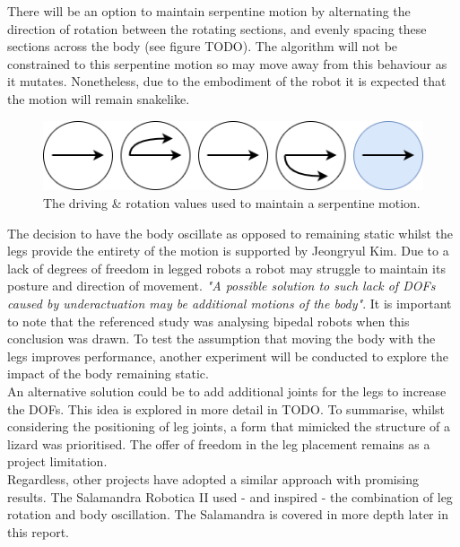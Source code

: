 \documentclass{article}
\begin{document}
There will be an option to maintain serpentine motion by alternating the direction of rotation between the rotating sections, and evenly spacing these sections across the body (see figure TODO). The algorithm will not be constrained to this serpentine motion so may move away from this behaviour as it mutates. Nonetheless, due to the embodiment of the robot it is expected that the motion will remain snakelike.\\
\begin{figure}[H]
\centering
\includegraphics[scale=0.6]{serpentineDiagram}
\caption{The driving \& rotation values used to maintain a serpentine motion.}
\end{figure}

The decision to have the body oscillate as opposed to remaining static whilst the legs provide the entirety of the motion is supported by Jeongryul Kim. Due to a lack of degrees of freedom in legged robots a robot may struggle to maintain its posture and direction of movement. \textit{"A possible solution to such lack of DOFs caused by underactuation may be additional motions of the body"}.  
It is important to note that the referenced study was analysing bipedal robots when this conclusion was drawn. To test the assumption that moving the body with the legs improves performance, another experiment will be conducted to explore the impact of the body remaining static. \\
An alternative solution could be to add additional joints for the legs to increase the DOFs. This idea is explored in more detail in TODO. To summarise, whilst considering the positioning of leg joints, a form that mimicked the structure of a lizard was prioritised. The offer of freedom in the leg placement remains as a project limitation. \\
Regardless, other projects have adopted a similar approach with promising results. The Salamandra Robotica II used - and inspired - the combination of leg rotation and body oscillation.  The Salamandra is covered in more depth later in this report.
\end{document}
